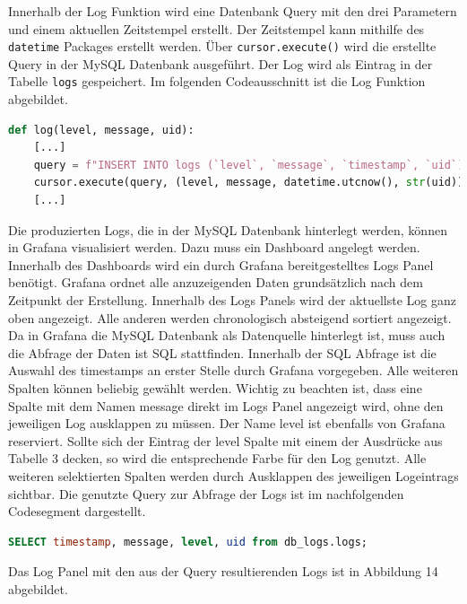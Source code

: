 Innerhalb der Log Funktion wird eine Datenbank Query mit den drei Parametern und einem aktuellen Zeitstempel erstellt. Der Zeitstempel kann mithilfe des \texttt{datetime} Packages erstellt werden. Über \texttt{cursor.execute()} wird die erstellte Query in der MySQL Datenbank ausgeführt. Der Log wird als Eintrag in der Tabelle \texttt{logs} gespeichert. Im folgenden Codeausschnitt ist die Log Funktion abgebildet.

\begin{lstlisting}[language=Python, caption={Erstellung eines Logs}]
def log(level, message, uid):
    [...]
    query = f"INSERT INTO logs (`level`, `message`, `timestamp`, `uid`) VALUES (%s, %s, %s, %s)"
    cursor.execute(query, (level, message, datetime.utcnow(), str(uid)))
    [...]
\end{lstlisting}

Die produzierten Logs, die in der MySQL Datenbank hinterlegt werden, können in Grafana visualisiert werden. Dazu muss ein Dashboard angelegt werden. Innerhalb des Dashboards wird ein durch Grafana bereitgestelltes Logs Panel benötigt. Grafana ordnet alle anzuzeigenden Daten grundsätzlich nach dem Zeitpunkt der Erstellung. Innerhalb des Logs Panels wird der aktuellste Log ganz oben angezeigt. Alle anderen werden chronologisch absteigend sortiert angezeigt. Da in Grafana die MySQL Datenbank als Datenquelle hinterlegt ist, muss auch die Abfrage der Daten ist SQL stattfinden. Innerhalb der SQL Abfrage ist die Auswahl des timestamps an erster Stelle durch Grafana vorgegeben. Alle weiteren Spalten können beliebig gewählt werden. Wichtig zu beachten ist, dass eine Spalte mit dem Namen \glqq message\grqq{} direkt im Logs Panel angezeigt wird, ohne den jeweiligen Log ausklappen zu müssen. Der Name \glqq level\grqq{} ist ebenfalls von Grafana reserviert. Sollte sich der Eintrag der \glqq level\grqq{} Spalte mit einem der Ausdrücke aus Tabelle 3 decken, so wird die entsprechende Farbe für den Log genutzt. Alle weiteren selektierten Spalten werden durch Ausklappen des jeweiligen Logeintrags sichtbar. Die genutzte Query zur Abfrage der Logs ist im nachfolgenden Codesegment dargestellt.

\begin{lstlisting}[language=SQL, caption={Query zur Abfrage der Logs in Grafana}]
SELECT timestamp, message, level, uid from db_logs.logs;
\end{lstlisting}

Das Log Panel mit den aus der Query resultierenden Logs ist in Abbildung 14 abgebildet.

